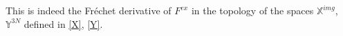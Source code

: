 \documentclass{ws-m3as}
\newcommand{\uld}[1]{\underline{d#1}}
\newcommand\tauone{\tau^{(II)}}
\newcommand\tII{t_{II}}
\begin{document}

This is indeed the Fr\'{e}chet derivative of $F^{ex}$ in the topology of the spaces $\mathbb{X}^{img}$, $\mathbb{Y}^{3N}$ defined in \eqref{X}, \eqref{Y}. 
\end{document}
